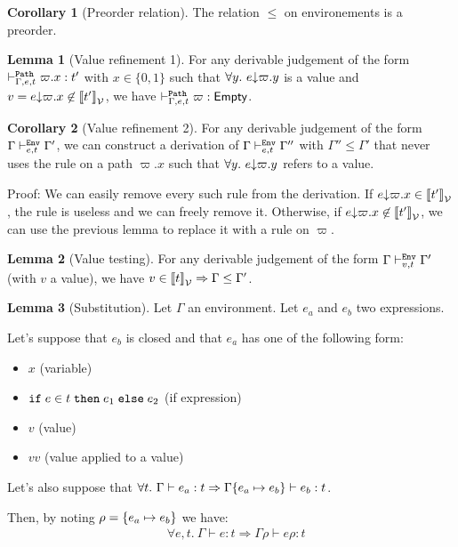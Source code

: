\documentclass[a4paper]{article}
\theoremstyle{definition}
\newtheorem{lemma}{Lemma}
\newtheorem{corollary}{Corollary}
\begin{document}
        \begin{corollary}[Preorder relation]
          The relation $\leq$ on environements is a preorder.
        \end{corollary}

        \begin{lemma}[Value refinement 1]
          For any derivable judgement of the form $\vdash^{\texttt{Path}}_{\Gamma,e,t} \varpi.x:t'$ with $x\in\{0,1\}$ such that $\forall y.\ e{\downarrow}\varpi.y$ is a value
          and $v = e{\downarrow}\varpi.x \not\in {\llbracket t' \rrbracket}_{\mathcal{V}}$, we have $\vdash^{\texttt{Path}}_{\Gamma,e,t} \varpi:\textsf{Empty}$.
        \end{lemma}

        \begin{corollary}[Value refinement 2]
          For any derivable judgement of the form $\Gamma \vdash^{\texttt{Env}}_{e,t} \Gamma'$, we can construct a derivation of $\Gamma \vdash^{\texttt{Env}}_{e,t} \Gamma''$ with $\Gamma''\leq\Gamma'$
          that never uses the rule  on a path $\varpi.x$ such that $\forall y.\ e{\downarrow}\varpi.y$ refers to a value.
        \end{corollary}
        Proof: We can easily remove every such rule from the derivation. If $e{\downarrow}\varpi.x \in {\llbracket t' \rrbracket}_{\mathcal{V}}$, the  rule is useless
        and we can freely remove it. Otherwise, if $e{\downarrow}\varpi.x \not\in {\llbracket t' \rrbracket}_{\mathcal{V}}$, we can use the previous lemma to
        replace it with a  rule on $\varpi$.

        \begin{lemma}[Value testing]
          For any derivable judgement of the form $\Gamma \vdash^{\texttt{Env}}_{v,t} \Gamma'$ (with $v$ a value),
          we have $v \in {\llbracket t \rrbracket}_{\mathcal{V}} \Rightarrow \Gamma\leq\Gamma'$.
        \end{lemma}

        \begin{lemma}[Substitution]
          Let $\Gamma$ an environment. Let $e_a$ and $e_b$ two expressions.

          Let's suppose that $e_b$ is closed and that $e_a$ has one of the following form:
          \begin{itemize}
            \item $x$ (variable)
            \item $\texttt{if}\;e\in t\;\texttt{then}\;e_1\;\texttt{else}\;e_2$ (if expression)
            \item $v$ (value)
            \item $v v$ (value applied to a value)
          \end{itemize}
          Let's also suppose that $\forall t.\ \Gamma \vdash e_a : t \Rightarrow \Gamma\{e_a \mapsto e_b\} \vdash e_b:t$.
          
          Then, by noting $\rho = \{e_a \mapsto e_b\}$ we have:
          \begin{align*}
            &\forall e,t.\ \Gamma \vdash e:t \Rightarrow \Gamma\rho \vdash e\rho:t
          \end{align*}
        \end{lemma}
\end{document}
